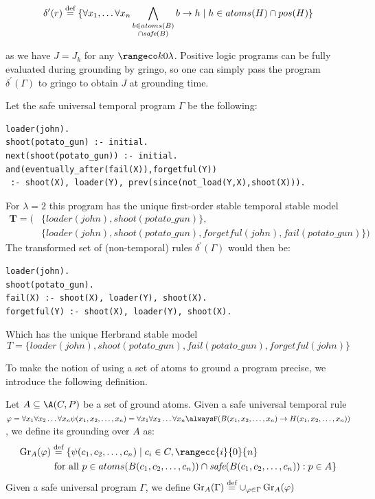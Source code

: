 \begin{equation*} \delta^{\prime}(r) \stackrel{\text{def}}{=} \{ \forall x_1, \dots \forall x_n
  \bigwedge_{\substack{b \in atoms(B)\\ \cap \textit{safe}(B)}}b
  \rightarrow h \mid h \in atoms(H) \cap pos(H)\}
\end{equation*}

as we have $J = J_k$ for any $\kinlambda$. Positive logic programs can
be fully evaluated during grounding by gringo, so one can simply pass
the program $\delta^{\prime}(\Gamma)$ to gringo to obtain $J$ at
grounding time.

\begin{example}\label{exam:shoot-nonground-safe}
  Let the safe universal temporal program $\Gamma$ be the following:
  \begin{lstlisting}[language=clingo,numbers=none]
loader(john).
shoot(potato_gun) :- initial.
next(shoot(potato_gun)) :- initial.
and(eventually_after(fail(X)),forgetful(Y))
 :- shoot(X), loader(Y), prev(since(not_load(Y,X),shoot(X))).
  \end{lstlisting}
  For $\lambda=2$ this program has the unique first-order stable
  temporal stable model
  \begin{align*}
  \bm{T} = (&\{ loader(john), shoot(potato\_gun) \},\\
            &\{ loader(john), shoot(potato\_gun), forgetful(john), fail(potato\_gun) \})
  \end{align*}
  The transformed set of (non-temporal) rules
  $\delta^{\prime}(\Gamma)$ would then be:
  \begin{lstlisting}[language=clingo,numbers=none]
loader(john).
shoot(potato_gun).
fail(X) :- shoot(X), loader(Y), shoot(X).
forgetful(Y) :- shoot(X), loader(Y), shoot(X).
  \end{lstlisting}
  Which has the unique Herbrand stable model
  $$
  T = \{ loader(john), shoot(potato\_gun), fail(potato\_gun), forgetful(john) \}
  $$
\end{example}

To make the notion of using a set of atoms to ground a program
precise, we introduce the following definition.

\begin{definition}
  Let $A \subseteq \A(C,P)$ be a set of ground atoms. Given a safe
  universal temporal rule
  $\varphi = \forallx \psi(x_1,x_2,\dots,x_n) = \forallx \alwaysF
  (B(x_1,x_2,\dots,x_n) \rightarrow H(x_1,x_2,\dots,x_n))$, we define
  its grounding over $A$ as:
  \begin{align*}
    \ground{A}{\varphi}& \defeq \{ \psi(c_1,c_2,\dots,c_n) \mid c_i \in C, \rangecc{i}{0}{n}\\
    &\text{ for all } p \in atoms(B(c_1,c_2,\dots,c_n)) \cap \safe{B(c_1,c_2,\dots,c_n)}:p \in A \}
  \end{align*}
  Given a safe universal program $\Gamma$, we define
  $\operatorname{Gr}_{A}(\Gamma) \stackrel{\text{def}}{=} \cup_{\varphi \in
    \Gamma}\operatorname{Gr}_{A}(\varphi)$
\end{definition}

